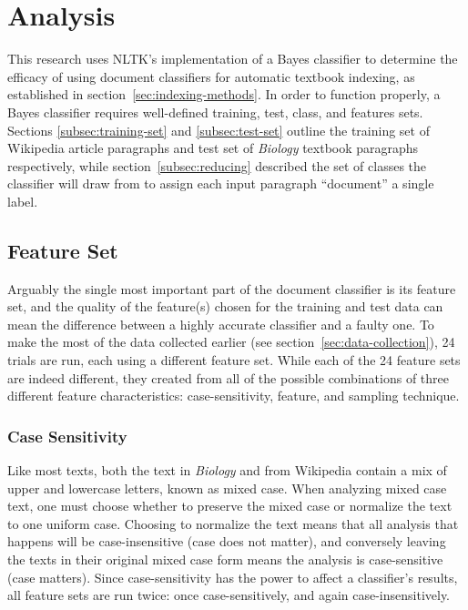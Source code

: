 \section{Analysis}

This research uses NLTK's implementation of a \naive Bayes classifier to determine the efficacy of using document classifiers for automatic textbook indexing, as established in section~\ref{sec:indexing-methods}.
In order to function properly, a \naive Bayes classifier requires well-defined training, test, class, and features sets.
Sections \ref{subsec:training-set} and \ref{subsec:test-set} outline the training set of Wikipedia article paragraphs and test set of {\it Biology} textbook paragraphs respectively, while section~\ref{subsec:reducing} described the set of classes the classifier will draw from to assign each input paragraph  ``document'' a single label.

\subsection{Feature Set}

Arguably the single most important part of the document classifier is its feature set, and the quality of the feature(s) chosen for the training and test data can mean the difference between a highly accurate classifier and a faulty one.
To make the most of the data collected earlier (see section~\ref{sec:data-collection}), 24 trials are run, each using a different feature set.
While each of the 24 feature sets are indeed different, they created from all of the possible combinations of three different feature characteristics: case-sensitivity, feature, and sampling technique.

\subsubsection{Case Sensitivity}

Like most texts, both the text in {\it Biology} and from Wikipedia contain a mix of upper and lowercase letters, known as mixed case.
When analyzing mixed case text, one must choose whether to preserve the mixed case or normalize the text to one uniform case.
Choosing to normalize the text means that all analysis that happens will be case-insensitive (case does not matter), and conversely leaving the texts in their original mixed case form means the analysis is case-sensitive (case matters).
Since case-sensitivity has the power to affect a classifier's results, all feature sets are run twice: once case-sensitively, and again case-insensitively.

